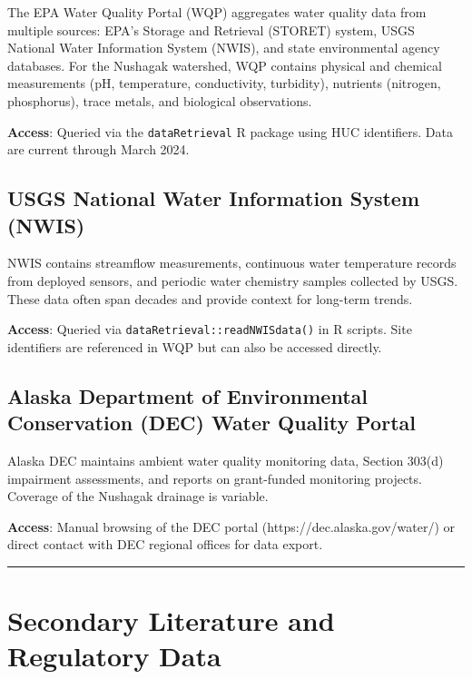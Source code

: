 \documentclass[
  letterpaper,
]{scrbook}
\begin{document}
The EPA Water Quality Portal (WQP) aggregates water quality data from
multiple sources: EPA's Storage and Retrieval (STORET) system, USGS
National Water Information System (NWIS), and state environmental agency
databases. For the Nushagak watershed, WQP contains physical and
chemical measurements (pH, temperature, conductivity, turbidity),
nutrients (nitrogen, phosphorus), trace metals, and biological
observations.

\textbf{Access}: Queried via the \texttt{dataRetrieval} R package using
HUC identifiers. Data are current through March 2024.

\subsection{USGS National Water Information System
(NWIS)}\label{usgs-national-water-information-system-nwis}

NWIS contains streamflow measurements, continuous water temperature
records from deployed sensors, and periodic water chemistry samples
collected by USGS. These data often span decades and provide context for
long-term trends.

\textbf{Access}: Queried via \texttt{dataRetrieval::readNWISdata()} in R
scripts. Site identifiers are referenced in WQP but can also be accessed
directly.

\subsection{Alaska Department of Environmental Conservation (DEC) Water
Quality
Portal}\label{alaska-department-of-environmental-conservation-dec-water-quality-portal}

Alaska DEC maintains ambient water quality monitoring data, Section
303(d) impairment assessments, and reports on grant-funded monitoring
projects. Coverage of the Nushagak drainage is variable.

\textbf{Access}: Manual browsing of the DEC portal
(https://dec.alaska.gov/water/) or direct contact with DEC regional
offices for data export.

\begin{center}\rule{0.5\linewidth}{0.5pt}\end{center}

\section{Secondary Literature and Regulatory
Data}\label{secondary-literature-and-regulatory-data}
\end{document}
